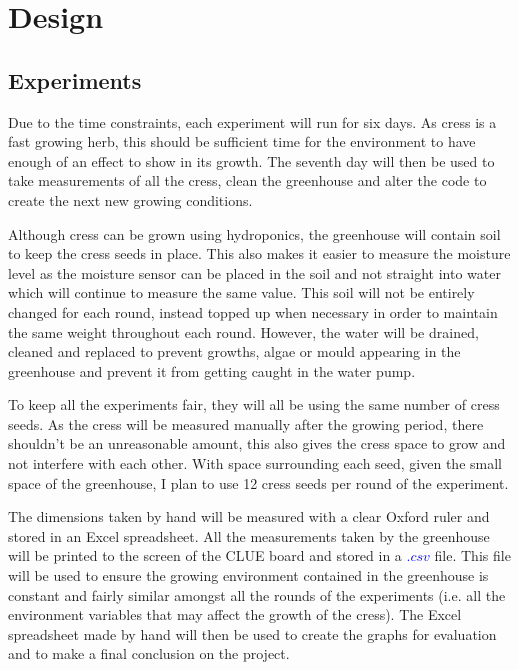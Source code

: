 \chapter{Design}


\section{Experiments}

Due to the time constraints, each experiment will run for six days. As cress is a fast growing herb, this should be sufficient time for the environment to have enough of an effect to show in its growth. The seventh day will then be used to take measurements of all the cress, clean the greenhouse and alter the code to create the next new growing conditions.

Although cress can be grown using hydroponics, the greenhouse will contain soil to keep the cress seeds in place. This also makes it easier to measure the moisture level as the moisture sensor can be placed in the soil and not straight into water which will continue to measure the same value. This soil will not be entirely changed for each round, instead topped up when necessary in order to maintain the same weight throughout each round. However, the water will be drained, cleaned and replaced to prevent growths, algae or mould appearing in the greenhouse and prevent it from getting caught in the water pump.

To keep all the experiments fair, they will all be using the same number of cress seeds. As the cress will be measured manually after the growing period, there shouldn't be an unreasonable amount, this also gives the cress space to grow and not interfere with each other. With space surrounding each seed, given the small space of the greenhouse, I plan to use 12 cress seeds per round of the experiment.

The dimensions taken by hand will be measured with a clear Oxford ruler and stored in an Excel spreadsheet. All the measurements taken by the greenhouse will be printed to the screen of the CLUE board and stored in a \textcolor{blue}{$.csv$} file. This file will be used to ensure the growing environment contained in the greenhouse is constant and fairly similar amongst all the rounds of the experiments (i.e. all the environment variables that may affect the growth of the cress). The Excel spreadsheet made by hand will then be used to create the graphs for evaluation and to make a final conclusion on the project. 

